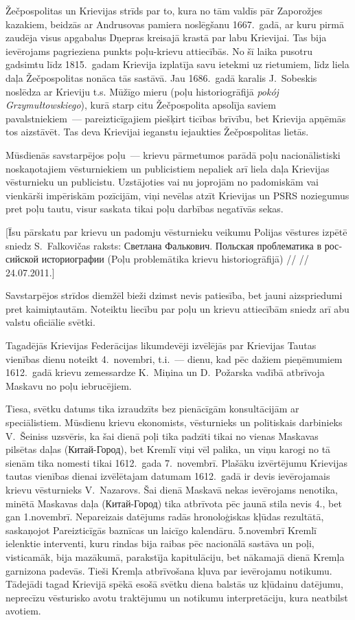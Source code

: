 \documentclass[twoside,a5paper,12pt,fleqn,openany]{extbook}
\newcommand{\pltxti}[1]{\textit{\textpolish{#1}}}
\newcommand{\rutxti}[1]{\textrussian{#1}}
\begin{document}
Žečpospolitas un Krievijas strīds par to, kura no tām valdīs pār Zaporožjes kazakiem, beidzās ar Andrusovas pamiera noslēgšanu 1667.~gadā, ar kuru pirmā zaudēja visus apgabalus Dņepras kreisajā krastā par labu Krievijai. Tas bija ievērojams pagrieziena punkts poļu-krievu attiecībās. No šī laika pusotru gadsimtu līdz 1815.~gadam Krievija izplatīja savu ietekmi uz rietumiem, līdz liela daļa Žečpospolitas nonāca tās sastāvā. Jau 1686.~gadā karalis J.~Sobeskis noslēdza ar Krieviju t.s. Mūžīgo mieru (poļu historiogrāfijā \pltxti{pokój Grzymułtowskiego}), kurā starp citu Žečpospolita apsolīja saviem pavalstniekiem~--- pareizticīgajiem piešķirt ticības brīvību, bet Krievija apņēmās tos aizstāvēt. Tas deva Krievijai ieganstu iejaukties Žečpospolitas lietās.

Mūsdienās savstarpējos poļu~--- krievu pārmetumos parādā poļu nacionālistiski noskaņotajiem vēsturniekiem un publicistiem nepaliek arī liela daļa Krievijas vēsturnieku un publicistu. Uzstājoties vai nu joprojām no padomiskām vai vienkārši impēriskām pozīcijām, viņi nevēlas atzīt Krievijas un PSRS noziegumus pret poļu tautu, visur saskata tikai poļu darbības negatīvās sekas.

[Īsu pārskatu par krievu un padomju vēsturnieku veikumu Polijas vēstures izpētē sniedz S.~Falkovičas raksts: \rutxti{Светлана Фалькович. Польская проблематика в российской историографии} (Poļu problemātika krievu historiogrāfijā) // %
// 24.07.2011.]

Savstarpējos strīdos diemžēl bieži dzimst nevis patiesība, bet jauni aizspriedumi pret kaimiņtautām. Noteiktu liecību par poļu un krievu attiecībām sniedz arī abu valstu oficiālie svētki.

Tagadējās Krievijas Federācijas likumdevēji izvēlējās par Krievijas Tautas vienības dienu noteikt 4.~novembri, t.i.~--- dienu, kad pēc dažiem pieņēmumiem 1612.~gadā krievu zemessardze K.~Miņina un D.~Požarska vadībā atbrīvoja Maskavu no poļu iebrucējiem.

Tiesa, svētku datums tika izraudzīts bez pienācīgām konsultācijām ar speciālistiem. Mūsdienu krievu ekonomists, vēsturnieks un politiskais darbinieks V.~Šeiniss uzsvēris, ka šai dienā poļi tika padzīti tikai no vienas Maskavas pilsētas daļas (\rutxti{Китай-Город}), bet Kremlī viņi vēl palika, un viņu karogi no tā sienām tika nomesti tikai 1612.~gada 7.~novembrī. Plašāku izvērtējumu Krievijas tautas vienības dienai izvēlētajam datumam 1612.~gadā ir devis ievērojamais krievu vēsturnieks V.~Nazarovs. Šai dienā Maskavā nekas ievērojams nenotika, minētā Maskavas daļa (\rutxti{Китай-Город}) tika atbrīvota pēc jaunā stila nevis 4., bet gan 1.novembrī. Nepareizais datējums radās hronoloģiskas kļūdas rezultātā, saskaņojot Pareizticīgās baznīcas un laicīgo kalendāru. 5.novembrī Kremlī ielenktie interventi, kuru rindas bija raibas pēc nacionālā sastāva un poļi, visticamāk, bija mazākumā, parakstīja kapitulāciju, bet nākamajā dienā Kremļa garnizona padevās. Tieši Kremļa atbrīvošana kļuva par ievērojamu notikumu. Tādejādi tagad Krievijā spēkā esošā svētku diena balstās uz kļūdainu datējumu, neprecīzu vēsturisko avotu traktējumu un notikumu interpretāciju, kura neatbilst avotiem.
\end{document}
